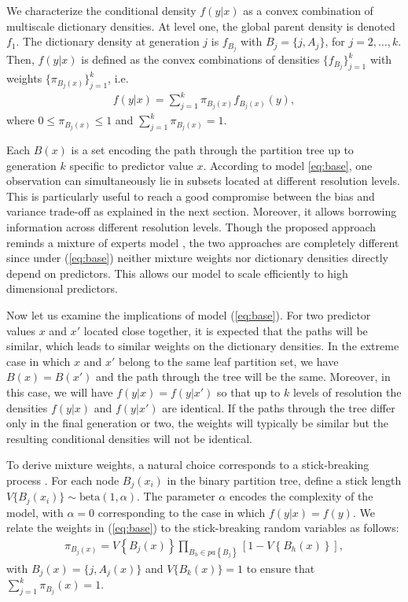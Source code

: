 \documentclass{article}
\begin{document}
We characterize the conditional density $f(y|x)$ as a convex combination of multiscale dictionary densities.  At level one, the global parent density is denoted $f_1$. The dictionary density at generation $j$ is $f_{B_j}$ with $B_j=\{j,A_j\}$, for $j=2,\ldots, k$. Then, $f(y|x)$ is defined as the convex combinations of densities $\{f_{B_j}\}_{j=1}^k$ with weights $\{\pi_{B_j(x)} \}_{j=1}^k$, i.e.
\begin{eqnarray}
f(y|x) = \sum_{j=1}^k \pi_{B_j(x)} f_{B_j(x)}(y),  \label{eq:base}
\end{eqnarray}
where $0 \le \pi_{B_j(x)} \le 1$ and $\sum_{j=1}^k \pi_{B_j(x)}=1$.

Each $B(x)$ is a set encoding the path through the partition tree up to generation $k$ specific to predictor value $x$. According to model \ref{eq:base}, one observation can simultaneously lie in subsets located at different resolution levels. This is particularly useful to reach a good compromise between the bias and variance trade-off as explained in the next section.  Moreover, it allows borrowing information across different resolution levels. Though the proposed approach reminds a mixture of experts model \cite{mixtureexperts}, the two approaches are  completely different since under (\ref{eq:base}) neither mixture weights nor dictionary densities directly depend on predictors. This allows our model to scale efficiently to high dimensional predictors.

Now let us examine the implications of model (\ref{eq:base}). For two predictor values $x$ and $x'$ located close together, it is expected that the paths will be similar, which leads to similar weights on the dictionary densities.  In the extreme case in which $x$ and $x'$ belong to the same leaf partition set, we have $B(x) = B(x')$ and the path through the tree will be the same.  Moreover, in this case, we will have $f(y|x)=f(y|x')$ so that up to $k$ levels of resolution the densities $f(y|x)$ and $f(y|x')$ are identical.  If the paths through the tree differ only in the final generation or two, the weights will typically be similar but the resulting conditional densities will not be identical. 

To derive mixture weights, a natural choice corresponds to a stick-breaking process \cite{stickbreaking}.  For each node $B_j(x_i)$ in the binary partition tree, define a stick length $V\{B_j(x_i)\} \sim \mbox{beta}(1,\alpha)$.  The parameter $\alpha$ encodes the complexity of the model, with $\alpha = 0$ corresponding to the case in which $f(y|x) = f(y)$.  We relate the weights in (\ref{eq:base}) to the stick-breaking random variables as follows: 
\begin{eqnarray*}
\pi_{B_j(x)} = V\left\{B_j(x)\right\} \prod_{B_h \in pa\left\{B_j\right\}} \left[1 - V\left\{B_h(x)\right\}\right],
\end{eqnarray*}
with $B_j(x)=\{j,A_j(x)\}$ and $V\{B_k(x)\}=1$ to ensure that $\sum_{j=1}^k \pi_{B_j}(x) = 1$.    
\vskip 12pt
\end{document}
